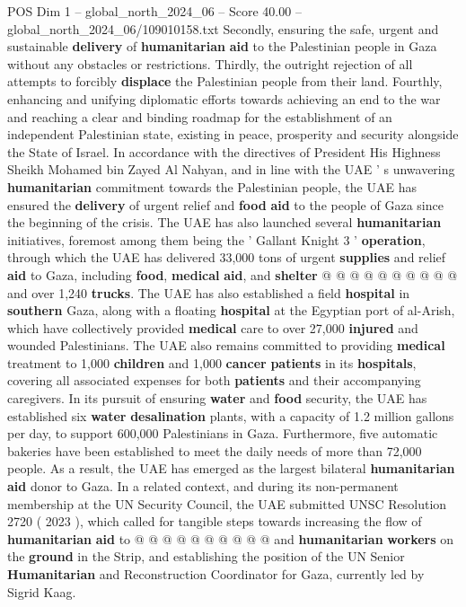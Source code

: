\begin{textsample}{POS Dim 1 – global\_north\_2024\_06 – Score 40.00 – global\_north\_2024\_06/109010158.txt}
Secondly, ensuring the safe, urgent and sustainable \textbf{delivery} of \textbf{humanitarian} \textbf{aid} to the Palestinian people in Gaza without any obstacles or restrictions.
Thirdly, the outright rejection of all attempts to forcibly \textbf{displace} the Palestinian people from their land.
Fourthly, enhancing and unifying diplomatic efforts towards achieving an end to the war and reaching a clear and binding roadmap for the establishment of an independent Palestinian state, existing in peace, prosperity and security alongside the State of Israel.
In accordance with the directives of President His Highness Sheikh Mohamed bin Zayed Al Nahyan, and in line with the UAE ' s unwavering \textbf{humanitarian} commitment towards the Palestinian people, the UAE has ensured the \textbf{delivery} of urgent relief and \textbf{food} \textbf{aid} to the people of Gaza since the beginning of the crisis.
The UAE has also launched several \textbf{humanitarian} initiatives, foremost among them being the ' Gallant Knight 3 ' \textbf{operation}, through which the UAE has delivered 33,000 tons of urgent \textbf{supplies} and relief \textbf{aid} to Gaza, including \textbf{food}, \textbf{medical} \textbf{aid}, and \textbf{shelter} @ @ @ @ @ @ @ @ @ @ and over 1,240 \textbf{trucks}.
The UAE has also established a field \textbf{hospital} in \textbf{southern} Gaza, along with a floating \textbf{hospital} at the Egyptian port of al-Arish, which have collectively provided \textbf{medical} care to over 27,000 \textbf{injured} and wounded Palestinians.
The UAE also remains committed to providing \textbf{medical} treatment to 1,000 \textbf{children} and 1,000 \textbf{cancer} \textbf{patients} in its \textbf{hospitals}, covering all associated expenses for both \textbf{patients} and their accompanying caregivers.
In its pursuit of ensuring \textbf{water} and \textbf{food} security, the UAE has established six \textbf{water} \textbf{desalination} plants, with a capacity of 1.2 million gallons per day, to support 600,000 Palestinians in Gaza.
Furthermore, five automatic bakeries have been established to meet the daily needs of more than 72,000 people.
As a result, the UAE has emerged as the largest bilateral \textbf{humanitarian} \textbf{aid} donor to Gaza.
In a related context, and during its non-permanent membership at the UN Security Council, the UAE submitted UNSC Resolution 2720 ( 2023 ), which called for tangible steps towards increasing the flow of \textbf{humanitarian} \textbf{aid} to @ @ @ @ @ @ @ @ @ @ and \textbf{humanitarian} \textbf{workers} on the \textbf{ground} in the Strip, and establishing the position of the UN Senior \textbf{Humanitarian} and Reconstruction Coordinator for Gaza, currently led by Sigrid Kaag.

\end{textsample}
